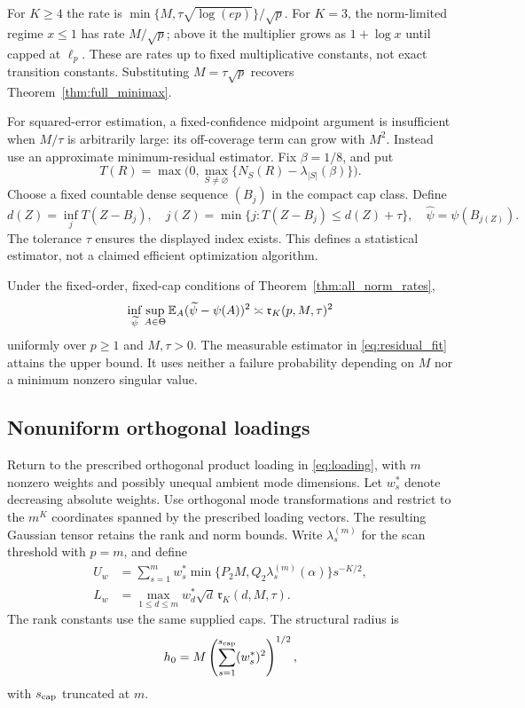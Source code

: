 For $K\ge4$ the rate is $\min\{M,\tau\sqrt{\log(ep)}\}/\sqrt p$. For $K=3$, the norm-limited regime $x\le1$ has rate $M/\sqrt p$; above it the multiplier grows as $1+\log x$ until capped at $\ell_p$. These are rates up to fixed multiplicative constants, not exact transition constants. Substituting $M=\tau\sqrt p$ recovers Theorem~\ref{thm:full_minimax}.

For squared-error estimation, a fixed-confidence midpoint argument is insufficient when $M/\tau$ is arbitrarily large: its off-coverage term can grow with $M^2$. Instead use an approximate minimum-residual estimator. Fix $\beta=1/8$, and put
\[
 T(R)=\max\bigl(0,\max_{S\ne\varnothing}
                  \{N_S(R)-\lambda_{|S|}(\beta)\}\bigr).
\]
Choose a fixed countable dense sequence $(B_j)$ in the compact cap class. Define
\begin{equation}\label{eq:residual_fit}
 d(Z)=\inf_j T(Z-B_j),\quad
 j(Z)=\min\{j:T(Z-B_j)\le d(Z)+\tau\},\quad
 \widehat\psi=\psi(B_{j(Z)}).
\end{equation}
The tolerance $\tau$ ensures the displayed index exists. This defines a statistical estimator, not a claimed efficient optimization algorithm.

\begin{theorem}\label{thm:all_norm_mse}
Under the fixed-order, fixed-cap conditions of Theorem~\ref{thm:all_norm_rates},
\[
 \inf_{\widetilde\psi}\sup_{A\in\Theta}
       \mathbb E_A(\widetilde\psi-\psi(A))^2
       \asymp\mathfrak r_K(p,M,\tau)^2
\]
uniformly over $p\ge1$ and $M,\tau>0$. The measurable estimator in \eqref{eq:residual_fit} attains the upper bound. It uses neither a failure probability depending on $M$ nor a minimum nonzero singular value.
\end{theorem}

\subsection{Nonuniform orthogonal loadings}

Return to the prescribed orthogonal product loading in \eqref{eq:loading}, with $m$ nonzero weights and possibly unequal ambient mode dimensions. Let $w_s^*$ denote decreasing absolute weights. Use orthogonal mode transformations and restrict to the $m^K$ coordinates spanned by the prescribed loading vectors. The resulting Gaussian tensor retains the rank and norm bounds. Write $\lambda_s^{(m)}$ for the scan threshold with $p=m$, and define
\begin{align}
 U_w&=\sum_{s=1}^m w_s^*
          \min\{P_2M,Q_2\lambda_s^{(m)}(\alpha)\}s^{-K/2},\label{eq:weighted_upper}\\
 L_w&=\max_{1\le d\le m} w_d^*\sqrt d\,
                  \mathfrak r_K(d,M,\tau).\label{eq:weighted_lower}
\end{align}
The rank constants use the same supplied caps. The structural radius is
\[
h_0=M\left(\sum_{s=1}^{s_{\rm cap}}(w_s^*)^2\right)^{1/2},
\]
with $s_{\rm cap}$ truncated at $m$.

